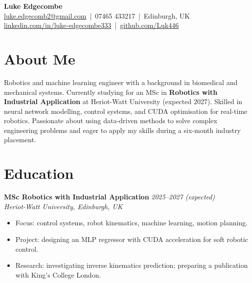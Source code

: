 \documentclass[a4paper,11pt]{article}
\begin{document}
\begin{center}
    {\LARGE \textbf{Luke Edgecombe}} \\[4pt]
    \href{mailto:luke.edgecomb2@gmail.com}{luke.edgecomb2@gmail.com} \,|\, 07465 433217 \,|\, Edinburgh, UK \\
    \href{https://linkedin.com/in/luke-edgecombe333}{linkedin.com/in/luke-edgecombe333} \,|\, 
    \href{https://github.com/Luk446}{github.com/Luk446}
\end{center}

\vspace{0.3cm}

\section*{About Me}
Robotics and machine learning engineer with a background in biomedical and mechanical systems. Currently studying for an MSc in \textbf{Robotics with Industrial Application} at Heriot-Watt University (expected 2027). Skilled in neural network modelling, control systems, and CUDA optimisation for real-time robotics. Passionate about using data-driven methods to solve complex engineering problems and eager to apply my skills during a six-month industry placement.

\section*{Education}

\textbf{MSc Robotics with Industrial Application} \hfill \textit{2025–2027 (expected)}\\
\textit{Heriot-Watt University, Edinburgh, UK}
\begin{itemize}
    \item Focus: control systems, robot kinematics, machine learning, motion planning.
    \item Project: designing an MLP regressor with CUDA acceleration for soft robotic control.
    \item Research: investigating inverse kinematics prediction; preparing a publication with King’s College London.
\end{itemize}
\end{document}
